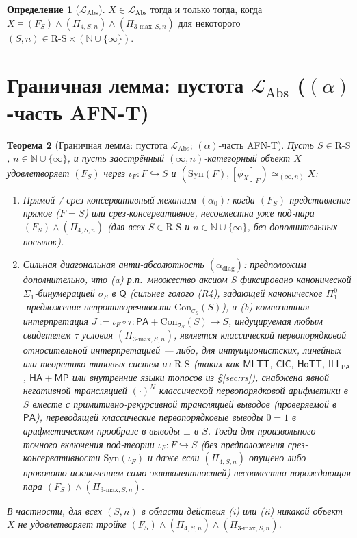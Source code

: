 \documentclass[11pt]{article}
\theoremstyle{plain}
\newtheorem{theorem}{Теорема}[section]
\theoremstyle{definition}
\newtheorem{definition}[theorem]{Определение}
\newcommand{\RS}{\mathrm{R\text{-}S}}
\newcommand{\LAbs}{\mathcal{L}_{\mathrm{Abs}}}
\newcommand{\Syn}{\mathrm{Syn}}
\newcommand{\Con}{\mathrm{Con}}
\newcommand{\PA}{\mathsf{PA}}
\newcommand{\MLTT}{\mathsf{MLTT}}
\newcommand{\HoTT}{\mathsf{HoTT}}
\newcommand{\CIC}{\mathsf{CIC}}
\begin{document}
\begin{definition}[$\LAbs$]\label{def:level6}
$X \in \LAbs$ тогда и только тогда, когда $X \models (F_S) \wedge (\Pi_{4, S, n}) \wedge (\Pi_{3\text{-max}, S, n})$ для некоторого $(S, n) \in \RS \times (\mathbb{N} \cup \{\infty\})$.
\end{definition}

\section{\texorpdfstring{Граничная лемма: пустота $\LAbs$ ($(\alpha)$-часть AFN-T)}{Граничная лемма: пустота L\_Abs ((alpha)-часть AFN-T)}}\label{sec:afnt-alpha}

\begin{theorem}[Граничная лемма: пустота $\LAbs$; $(\alpha)$-часть AFN-T]\label{thm:afnt-alpha}
Пусть $S \in \RS$, $n \in \mathbb{N} \cup \{\infty\}$, и пусть заострённый $(\infty, n)$-категорный объект $X$ удовлетворяет $(F_S)$ через $\iota_F : F \hookrightarrow S$ и $(\Syn(F), [\phi_X]_F) \simeq_{(\infty, n)} X$:
\begin{enumerate}[nosep,label=(\roman*)]
\item \emph{Прямой / срез-консервативный механизм $(\alpha_0)$}: когда $(F_S)$-представление прямое ($F = S$) или срез-консервативное, несовместна уже под-пара $(F_S) \wedge (\Pi_{4, S, n})$ (для всех $S \in \RS$ и $n \in \mathbb{N} \cup \{\infty\}$, без дополнительных посылок).
\item \emph{Сильная диагональная анти-абсолютность $(\alpha_{\mathrm{diag}})$}: предположим дополнительно, что (a) р.п.\ множество аксиом $S$ фиксировано канонической $\Sigma_1$-бинумерацией $\sigma_S$ в $\mathsf{Q}$ (сильнее голого (R4), задающей каноническое $\Pi_1^0$-предложение непротиворечивости $\Con_{\sigma_S}(S)$), и (b) композитная интерпретация $J := \iota_F \circ \tau : \PA + \Con_{\sigma_S}(S) \to S$, индуцируемая любым свидетелем $\tau$ условия $(\Pi_{3\text{-max}, S, n})$, является классической первопорядковой относительной интерпретацией --- либо, для интуиционистских, линейных или теоретико-типовых систем из $\RS$ (таких как $\MLTT$, $\CIC$, $\HoTT$, $\mathsf{ILL}_{\mathsf{PA}}$, $\mathsf{HA}+\mathsf{MP}$ или внутренние языки топосов из \S\ref{sec:rs}), снабжена явной негативной трансляцией $(\cdot)^N$ классической первопорядковой арифметики в $S$ вместе с примитивно-рекурсивной трансляцией выводов (проверяемой в $\PA$), переводящей классические первопорядковые выводы $0 = 1$ в арифметическом прообразе в выводы $\bot$ в $S$. Тогда для \emph{произвольного} точного включения под-теории $\iota_F : F \hookrightarrow S$ (без предположения срез-консервативности $\Syn(\iota_F)$ и даже если $(\Pi_{4, S, n})$ опущено либо проколото исключением само-эквивалентностей) несовместна порождающая пара $(F_S) \wedge (\Pi_{3\text{-max}, S, n})$.
\end{enumerate}
В частности, для всех $(S, n)$ в области действия (i) или (ii) никакой объект $X$ не удовлетворяет тройке $(F_S) \wedge (\Pi_{4, S, n}) \wedge (\Pi_{3\text{-max}, S, n})$.
\end{theorem}
\end{document}
